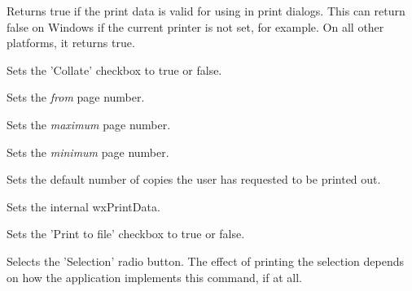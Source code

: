 Returns true if the print data is valid for using in print dialogs.
This can return false on Windows if the current printer is not set, for example.
On all other platforms, it returns true.


\label{wxprintdialogdatasetcollate}


Sets the 'Collate' checkbox to true or false.


\label{wxprintdialogdatasetfrompage}


Sets the {\it from} page number.


\label{wxprintdialogdatasetmaxpage}


Sets the {\it maximum} page number.


\label{wxprintdialogdatasetminpage}


Sets the {\it minimum} page number.


\label{wxprintdialogdatasetnocopies}


Sets the default number of copies the user has requested to be printed out.


\label{wxprintdialogdatasetprintdata}


Sets the internal wxPrintData.


\label{wxprintdialogdatasetprinttofile}


Sets the 'Print to file' checkbox to true or false.


\label{wxprintdialogdatasetselection}


Selects the 'Selection' radio button. The effect of printing the selection depends on how the application
implements this command, if at all.


